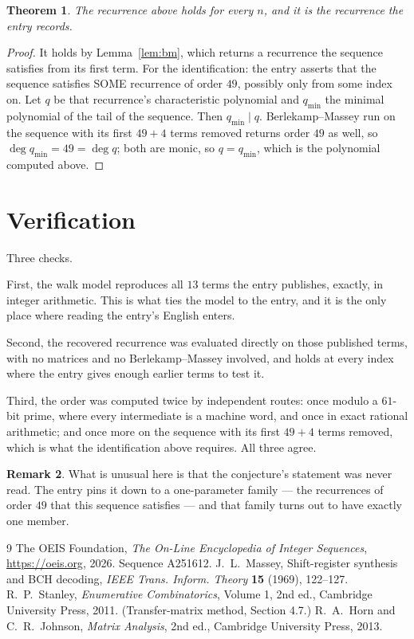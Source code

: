 \documentclass[11pt,a4paper]{article}
\theoremstyle{plain}
\newtheorem{theorem}{Theorem}
\theoremstyle{definition}
\newtheorem{remark}[theorem]{Remark}
\begin{document}
\begin{theorem}
The recurrence above holds for every $n$, and it is the recurrence the entry records.
\end{theorem}

\begin{proof}
It holds by Lemma~\ref{lem:bm}, which returns a recurrence the sequence satisfies from its
first term. For the identification: the entry asserts that the sequence satisfies SOME
recurrence of order $49$, possibly only from some index on. Let $q$ be that recurrence's
characteristic polynomial and $q_{\min}$ the minimal polynomial of the tail of the sequence.
Then $q_{\min}\mid q$. Berlekamp--Massey run on the sequence with its first $49+4$ terms
removed returns order $49$ as well, so $\deg q_{\min}=49=\deg q$; both are monic, so
$q=q_{\min}$, which is the polynomial computed above.
\end{proof}

\section{Verification}

Three checks.

First, the walk model reproduces all $13$ terms the entry publishes, exactly, in integer
arithmetic. This is what ties the model to the entry, and it is the only place where reading
the entry's English enters.

Second, the recovered recurrence was evaluated directly on those published terms, with no
matrices and no Berlekamp--Massey involved, and holds at every index where the entry gives
enough earlier terms to test it.

Third, the order was computed twice by independent routes: once modulo a $61$-bit prime, where
every intermediate is a machine word, and once in exact rational arithmetic; and once more on
the sequence with its first $49+4$ terms removed, which is what the identification above
requires. All three agree.

\begin{remark}
What is unusual here is that the conjecture's statement was never read. The entry pins it down
to a one-parameter family --- the recurrences of order $49$ that this sequence satisfies
--- and that family turns out to have exactly one member.
\end{remark}

\begin{thebibliography}{9}
 The OEIS Foundation, \emph{The On-Line Encyclopedia of Integer
Sequences}, \url{https://oeis.org}, 2026. Sequence A251612.
 J.~L.~Massey, Shift-register synthesis and BCH decoding, \emph{IEEE
Trans. Inform. Theory} \textbf{15} (1969), 122--127.
 R.~P.~Stanley, \emph{Enumerative Combinatorics}, Volume 1, 2nd ed.,
Cambridge University Press, 2011. (Transfer-matrix method, Section 4.7.)
 R.~A.~Horn and C.~R.~Johnson, \emph{Matrix Analysis}, 2nd ed., Cambridge
University Press, 2013.
\end{thebibliography}
\end{document}
